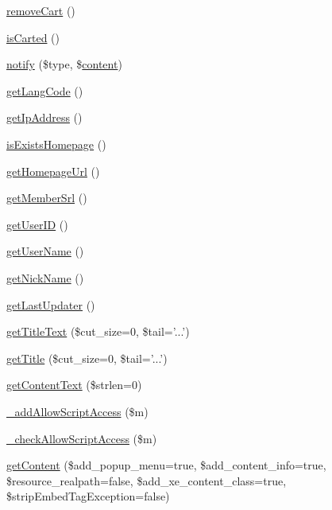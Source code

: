 \begin{DoxyCompactItemize}
\item 
\hyperlink{classdocumentItem_aa66932772c39aeff91238badd8246969}{remove\-Cart} ()
\item 
\hyperlink{classdocumentItem_a505c87502da3ca4b656230125ffa4f1e}{is\-Carted} ()
\item 
\hyperlink{classdocumentItem_afbccc4d35ce638fac62221e5602cc750}{notify} (\$type, \$\hyperlink{classcontent}{content})
\item 
\hyperlink{classdocumentItem_a7491640a855ace286820cb11f273ddb6}{get\-Lang\-Code} ()
\item 
\hyperlink{classdocumentItem_ac0e9b0006f067bc0918751148606d325}{get\-Ip\-Address} ()
\item 
\hyperlink{classdocumentItem_a7cc882ce0da6cbe675be8fdb980a0d97}{is\-Exists\-Homepage} ()
\item 
\hyperlink{classdocumentItem_ab9117599bb123e83289d2a24fd44bf50}{get\-Homepage\-Url} ()
\item 
\hyperlink{classdocumentItem_a75af5f05bd55c32bdc6c17dd8511e4e8}{get\-Member\-Srl} ()
\item 
\hyperlink{classdocumentItem_a66a8157a3cc7c82325eadcefe6390a58}{get\-User\-I\-D} ()
\item 
\hyperlink{classdocumentItem_a072696b683278c84bc3ebfee46d4216f}{get\-User\-Name} ()
\item 
\hyperlink{classdocumentItem_ab91ca9e1defb1a570212baa4f380706a}{get\-Nick\-Name} ()
\item 
\hyperlink{classdocumentItem_a784effc9e694d82da32e06e95482ff28}{get\-Last\-Updater} ()
\item 
\hyperlink{classdocumentItem_aad953dc30cf01a1d451cb90c66c09b0c}{get\-Title\-Text} (\$cut\-\_\-size=0, \$tail='...')
\item 
\hyperlink{classdocumentItem_a365509266cc36e56b66df824bc2fcbfc}{get\-Title} (\$cut\-\_\-size=0, \$tail='...')
\item 
\hyperlink{classdocumentItem_acdef9404e1dc50d82456fb112212e23e}{get\-Content\-Text} (\$strlen=0)
\item 
\hyperlink{classdocumentItem_a6bc6bbe65e83e9bfc03bae1fea5b75d7}{\-\_\-add\-Allow\-Script\-Access} (\$m)
\item 
\hyperlink{classdocumentItem_a0d88d945333c887802ad1f8442f5d5c7}{\-\_\-check\-Allow\-Script\-Access} (\$m)
\item 
\hyperlink{classdocumentItem_ab93870c122bc952a206f3c64ced3aa9e}{get\-Content} (\$add\-\_\-popup\-\_\-menu=true, \$add\-\_\-content\-\_\-info=true, \$resource\-\_\-realpath=false, \$add\-\_\-xe\-\_\-content\-\_\-class=true, \$strip\-Embed\-Tag\-Exception=false)

\end{DoxyCompactItemize}
